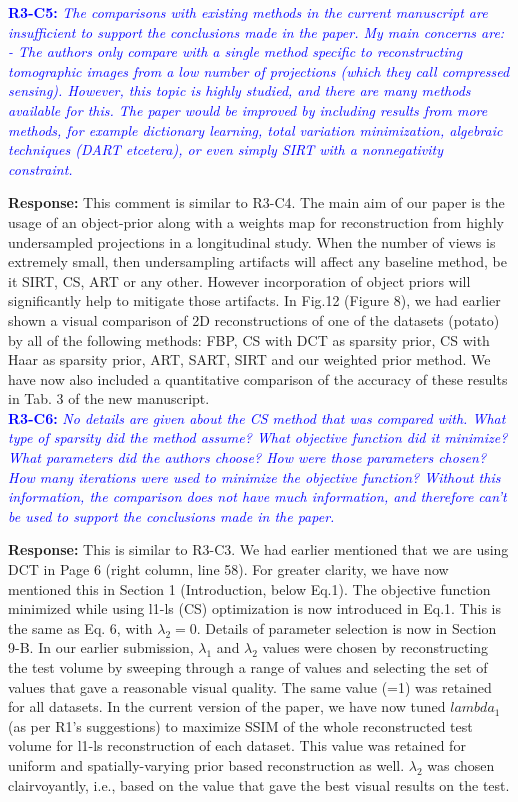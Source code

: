 \documentclass{article}
\begin{document}

\textcolor{blue}{\textbf{R3-C5:}\textit{ The comparisons with existing methods in the current manuscript are insufficient to support the conclusions made in the paper. My main concerns are: - The authors only compare with a single method specific to reconstructing tomographic images from a low number of projections (which they call compressed sensing). However, this topic is highly studied, and there are many methods available for this. The paper would be improved by including results from more methods, for example dictionary learning, total variation minimization, algebraic techniques (DART etcetera), or even simply SIRT with a nonnegativity constraint.}}

\textbf{Response:} This comment is similar to R3-C4. The main aim of our paper is the usage of an object-prior along with a weights map for reconstruction from highly undersampled projections in a longitudinal study. When the number of views is extremely small, then undersampling artifacts will affect any baseline method, be it SIRT, CS, ART or any other. However incorporation of object priors will significantly help to mitigate those artifacts.
In Fig.12 (Figure 8), we had earlier shown a visual comparison of 2D reconstructions of one of the datasets (potato) by all of the following methods: FBP, CS with DCT as sparsity prior, CS with Haar as sparsity prior, ART, SART, SIRT and our weighted prior method.
We have now also included a quantitative comparison of the accuracy of these results in Tab. 3 of the new manuscript.\\

\textcolor{blue}{\textbf{R3-C6:}\textit{ No details are given about the CS method that was compared with. What type of sparsity did the method assume? What objective function did it minimize? What parameters did the authors choose? How were those parameters chosen? How many iterations were used to minimize the objective function? Without this information, the comparison does not have much information, and therefore can't be used to support the conclusions made in the paper.}}

\textbf{Response:} This is similar to R3-C3. We had earlier mentioned that we are using DCT in Page 6 (right column, line 58). For greater clarity, we have now mentioned this in Section 1 (Introduction, below Eq.1).
The objective function minimized while using l1-ls (CS) optimization is now introduced in Eq.1. This is the same as Eq. 6,  with $\lambda_2 = 0$.
Details of parameter selection is now in Section 9-B.
In our earlier submission, $\lambda_1$ and $\lambda_2$ values were chosen by reconstructing the test volume by sweeping through a range of values and selecting the set of values that gave a reasonable visual quality. The same value (=1) was retained for all datasets. In the current version of the paper, we have now tuned $lambda_1$ (as per R1's suggestions) to maximize SSIM of the whole reconstructed test volume for l1-ls reconstruction of each dataset. This value was retained for uniform and spatially-varying prior based reconstruction as well. $\lambda_2$ was chosen clairvoyantly,  i.e., based on the value that gave the best visual results on the test.\\
\end{document}
